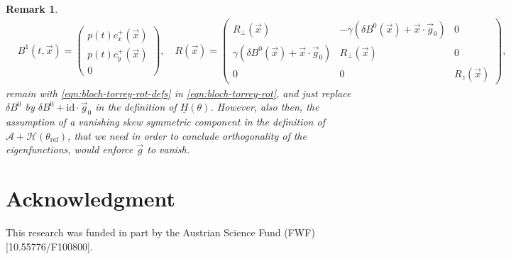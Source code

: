\documentclass[12pt]{article}
\newtheorem{remark}[theorem]{Remark}
\newcommand\calA{\mathcal{A}}
\newcommand\HH{\mathcal{H}}
\newcommand\Op{\mathcal{N}}
\newcommand\vecr{\vec{x}}
\newcommand\ulH{\underline{H}}
\begin{document}
\begin{remark}
\begin{equation*}
\begin{aligned}
&B^1(t, \vecr)=
\begin{pmatrix} p(t)c^+_{x}(\vecr)\\p(t)c^+_{y}(\vecr)\\0
\end{pmatrix},
\quad 
R(\vecr)=
\begin{pmatrix}
R_\perp(\vecr)&-\gamma(\delta B^0(\vecr)+\vecr \cdot \vec{g}_0)&0\\
\gamma(\delta B^0(\vecr)+\vecr \cdot \vec{g}_0)&R_\perp(\vecr)&0\\
0&0&R_z(\vecr)
\end{pmatrix},
\end{aligned}
\end{equation*}
remain with \eqref{eqn:bloch-torrey-rot-defs} in \eqref{eqn:bloch-torrey-rot}, and 
just replace $\delta B^0$ by $\delta B^0+\text{id}\cdot\vec{g}_0$ in the definition of $\ulH(\theta)$.
However, also then, the assumption of a vanishing skew symmetric component in the definition of $\calA+\HH(\theta_{\text{ref}})$, that we need in order to conclude orthogonality of the eigenfunctions, would enforce $\vec{g}$ to vanish. 
\end{remark}

\section*{Acknowledgment}
This research was funded in part by the Austrian Science Fund (FWF) 
[10.55776/F100800]. 
\end{document}
